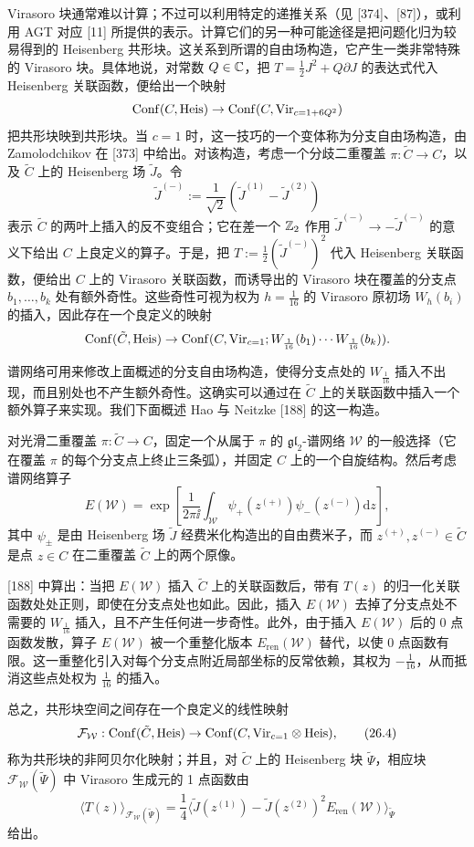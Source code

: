 Virasoro 块通常难以计算；不过可以利用特定的递推关系（见 [374]、[87]），或利用 AGT 对应 [11] 所提供的表示。计算它们的另一种可能途径是把问题化归为较易得到的 Heisenberg 共形块。这关系到所谓的自由场构造，它产生一类非常特殊的 Virasoro 块。具体地说，对常数 $Q\in\mathbb{C}$，把 $T=\frac12J^2+Q\partial J$ 的表达式代入 Heisenberg 关联函数，便给出一个映射
\[
\operatorname{Conf}(C,\mathrm{Heis})\to\operatorname{Conf}(C,\mathrm{Vir}_{c=1+6Q^2})
\]
把共形块映到共形块。当 $c=1$ 时，这一技巧的一个变体称为分支自由场构造，由 Zamolodchikov 在 [373] 中给出。对该构造，考虑一个分歧二重覆盖 $\pi:\tilde C\to C$，以及 $\tilde C$ 上的 Heisenberg 场 $\tilde J$。令
\[
\tilde J^{(-)}:=\frac{1}{\sqrt2}\left(\tilde J^{(1)}-\tilde J^{(2)}\right)
\]
表示 $\tilde C$ 的两叶上插入的反不变组合；它在差一个 $\mathbb{Z}_2$ 作用 $\tilde J^{(-)}\to-\tilde J^{(-)}$ 的意义下给出 $C$ 上良定义的算子。于是，把 $T:=\frac12(\tilde J^{(-)})^2$ 代入 Heisenberg 关联函数，便给出 $C$ 上的 Virasoro 关联函数，而诱导出的 Virasoro 块在覆盖的分支点 $b_1,\dots,b_k$ 处有额外奇性。这些奇性可视为权为 $h=\frac{1}{16}$ 的 Virasoro 原初场 $W_h(b_i)$ 的插入，因此存在一个良定义的映射
\[
\operatorname{Conf}(\tilde C,\mathrm{Heis})\to\operatorname{Conf}(C,\mathrm{Vir}_{c=1};W_{\frac{1}{16}}(b_1)\cdots W_{\frac{1}{16}}(b_k)).
\]

谱网络可用来修改上面概述的分支自由场构造，使得分支点处的 $W_{\frac{1}{16}}$ 插入不出现，而且别处也不产生额外奇性。这确实可以通过在 $\tilde C$ 上的关联函数中插入一个额外算子来实现。我们下面概述 Hao 与 Neitzke [188] 的这一构造。

对光滑二重覆盖 $\pi:\tilde C\to C$，固定一个从属于 $\pi$ 的 $\mathfrak{gl}_2$-谱网络 $\mathcal{W}$ 的一般选择（它在覆盖 $\pi$ 的每个分支点上终止三条弧），并固定 $C$ 上的一个自旋结构。然后考虑谱网络算子
\[
E(\mathcal{W})=\exp\left[\frac{1}{2\pi\ii}\int_{\mathcal{W}}\psi_+(z^{(+)})\psi_-(z^{(-)})\mathrm{d}z\right],
\]
其中 $\psi_\pm$ 是由 Heisenberg 场 $\tilde J$ 经费米化构造出的自由费米子，而 $z^{(+)},z^{(-)}\in\tilde C$ 是点 $z\in C$ 在二重覆盖 $\tilde C$ 上的两个原像。

[188] 中算出：当把 $E(\mathcal{W})$ 插入 $\tilde C$ 上的关联函数后，带有 $T(z)$ 的归一化关联函数处处正则，即使在分支点处也如此。因此，插入 $E(\mathcal{W})$ 去掉了分支点处不需要的 $W_{\frac{1}{16}}$ 插入，且不产生任何进一步奇性。此外，由于插入 $E(\mathcal{W})$ 后的 0 点函数发散，算子 $E(\mathcal{W})$ 被一个重整化版本 $E_{\mathrm{ren}}(\mathcal{W})$ 替代，以使 0 点函数有限。这一重整化引入对每个分支点附近局部坐标的反常依赖，其权为 $-\frac{1}{16}$，从而抵消这些点处权为 $\frac{1}{16}$ 的插入。

总之，共形块空间之间存在一个良定义的线性映射
\begin{equation}
\mathcal{F}_{\mathcal{W}}:\operatorname{Conf}(\tilde C,\mathrm{Heis})\to\operatorname{Conf}(C,\mathrm{Vir}_{c=1}\otimes\mathrm{Heis}),
\tag{26.4}
\end{equation}
称为共形块的非阿贝尔化映射；并且，对 $\tilde C$ 上的 Heisenberg 块 $\tilde\Psi$，相应块 $\mathcal{F}_{\mathcal{W}}(\tilde\Psi)$ 中 Virasoro 生成元的 1 点函数由
\[
\langle T(z)\rangle_{\mathcal{F}_{\mathcal{W}}(\tilde\Psi)}=\frac14\langle\tilde J(z^{(1)})-\tilde J(z^{(2)})^2E_{\mathrm{ren}}(\mathcal{W})\rangle_{\tilde\Psi}
\]
给出。

